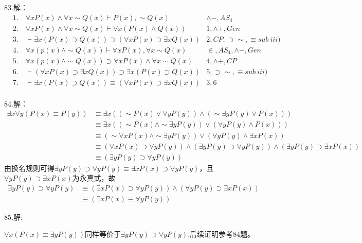 \documentclass[a4paper]{ctexart}
\begin{document}
\noindent 83.解：
\begin{align*}
  &1. \quad \forall{x}P(x)\wedge \forall{x}\sim Q(x) \vdash P(x),\sim Q(x) &\wedge-,AS_4\\
  &2. \quad \forall{x}P(x)\wedge \forall{x}\sim Q(x) \vdash \forall{x}(P(x)\wedge Q(x)) &1,\wedge+,Gen\\
  &3. \quad \vdash \exists{x}(P(x)\supset Q(x))\supset(\forall{x}P(x)\supset\exists{x}Q(x))   &2,CP,\supset\sim,\equiv sub\ iii)
  \\
  &4. \quad \forall{x}(p(x)\wedge\sim Q(x))\vdash \forall{x}P(x),\forall{x}\sim Q(x) &\in,AS_4,\wedge-,Gen\\
  &5. \quad \forall{x}(p(x)\wedge\sim Q(x))\supset \forall{x}P(x)\wedge\forall{x}\sim Q(x) &4,\wedge+, CP\\
  &6. \quad \vdash(\forall{x}P(x)\supset\exists{x}Q(x))\supset\exists{x}(P(x)\supset Q(x)) &5,\supset\sim,\equiv sub\ iii)\\
  &7. \quad \vdash \exists{x}(P(x)\supset Q(x))\equiv (\forall{x}P(x)\supset\exists{x}Q(x)) &3,6\\
\end{align*}

\noindent 84.解：
\begin{align*}
  \exists{x}\forall{y}(P(x)\equiv P(y))&\equiv\exists{x}((\sim P(x)\vee \forall{y}P(y))\wedge(\sim\exists{y}P(y)\vee P(x)))\\
  &\equiv\exists{x}((\sim P(x)\wedge\sim\exists{y}P(y))\vee(\forall{y}P(y)\wedge P(x))) \\
  &\equiv(\sim\forall{x}P(x)\wedge\sim\exists{y}P(y))\vee(\forall{y}P(y)\wedge\exists{x}P(x))\\
  &\equiv(\forall{x}P(x)\supset\forall{y}P(y))\wedge(\exists{y}P(y)\supset\forall{y}P(y))\wedge(\exists{y}P(y)\supset\exists{x}P(x))\\
  &\equiv(\exists{y}P(y)\supset\forall{y}P(y))
\end{align*}
由换名规则可得$\exists{y}P(y)\supset\forall{y}P(y)\equiv \exists{x}P(x)\supset\forall{y}P(y)$，且$\forall{y}P(y)\supset\exists{}{x}P(x)$为永真式，故
\begin{align*}
  \exists{y}P(y)\supset\forall{y}P(y) &\equiv (\exists{x}P(x)\supset\forall{y}P(y))\wedge(\forall{y}P(y)\supset\exists{}{x}P(x)) \\
  &\equiv(\exists{x}P(x)\equiv\forall{y}P(y))
\end{align*}

\noindent 85.解:

$\forall{x}(P(x)\equiv\exists{y}P(y))$同样等价于$\exists{y}P(y)\supset\forall{y}P(y)$,后续证明参考84题。\newline
\end{document}
